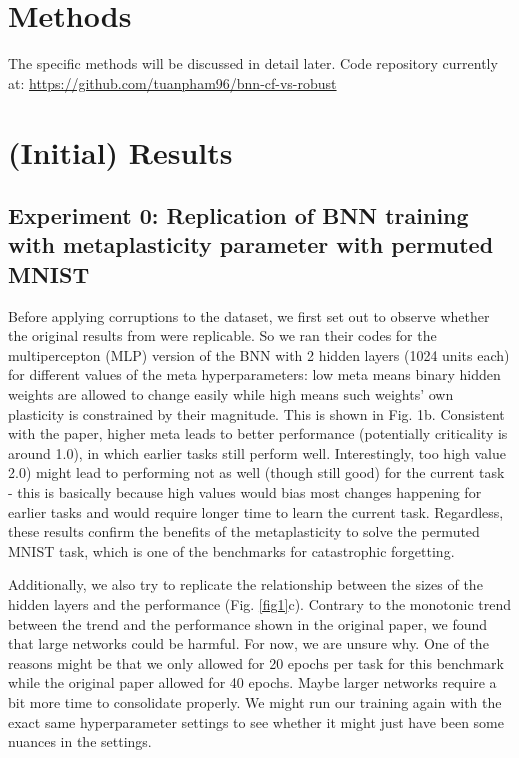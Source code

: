 \documentclass[manuscript,screen,review]{acmart}
\begin{document}
\section{Methods}
The specific methods will be discussed in detail later. Code repository currently at: 
\url{https://github.com/tuanpham96/bnn-cf-vs-robust}

\section{(Initial) Results}
\subsection{Experiment 0: Replication of BNN training with metaplasticity parameter with permuted MNIST
}

Before applying corruptions to the dataset, we first set out to observe whether the original results from \cite{Laborieux_Ernoult_Hirtzlin_Querlioz_2021} were replicable. So we ran their codes for the multipercepton (MLP) version of the BNN with 2 hidden layers (1024 units each) for different values of the meta hyperparameters: low meta means binary hidden weights are allowed to change easily while high means such weights’ own plasticity is constrained by their magnitude. This is shown in Fig. 1b. Consistent with the paper, higher meta leads to better performance (potentially criticality is around 1.0), in which earlier tasks still perform well. Interestingly, too high value 2.0) might lead to performing not as well (though still good) for the current task - this is basically because high values would bias most changes happening for earlier tasks and would require longer time to learn the current task. Regardless, these results confirm the benefits of the metaplasticity to solve the permuted MNIST task, which is one of the benchmarks for catastrophic forgetting. 

Additionally, we also try to replicate the relationship between the sizes of the hidden layers and the performance (Fig. \ref{fig1}c). Contrary to the monotonic trend between the trend and the performance shown in the original paper, we found that large networks could be harmful. For now, we are unsure why. One of the reasons might be that we only allowed for 20 epochs per task for this benchmark while the original paper allowed for 40 epochs. Maybe larger networks require a bit more time to consolidate properly. We might run our training again with the exact same hyperparameter settings to see whether it might just have been some nuances in the settings. 
\end{document}

